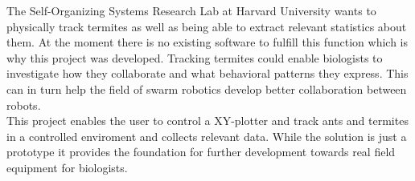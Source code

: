 


The Self-Organizing Systems Research Lab at Harvard University wants to physically track termites as well as being able to extract relevant statistics about them. At the moment there is no existing software to fulfill this function which is why this project was developed. Tracking termites could enable biologists to investigate how they collaborate and what behavioral patterns they express. This can in turn help the field of swarm robotics develop better collaboration between robots. \\

This project enables the user to control a XY-plotter and track ants and termites in a controlled enviroment and collects relevant data. While the solution is just a prototype it provides the foundation for further development towards real field equipment for biologists. 